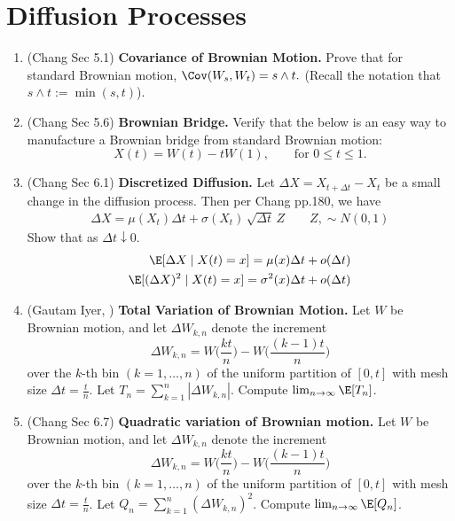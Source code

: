 \documentclass{article} %
\begin{document}
\section{Diffusion Processes}

\begin{enumerate}
	\item (Chang Sec 5.1) \textbf{Covariance of Brownian Motion.}  Prove that for standard Brownian motion, $\Cov(W_s, W_t) = s \wedge t.$ (Recall the notation that $s \wedge t := \min(s,t)$).
\item (Chang Sec 5.6) \textbf{Brownian Bridge.}  Verify that the below is an easy way to manufacture a Brownian bridge from standard Brownian motion:
	\[ X(t) = W(t)-t W(1), \qquad \text{for } 0 \leq t \leq 1.\]
\item (Chang Sec 6.1) \textbf{Discretized Diffusion.} Let $\Delta X = X_{t + \Delta t} - X_t$ be a small change in the diffusion process. Then per Chang pp.180, we have
	\begin{align*}
	 \Delta X = \mu(X_t) \Delta t + \sigma(X_t) \, \sqrt{\Delta t} \, Z  \qquad Z, \sim N(0,1)
	\end{align*}
	Show that as $\Delta t \downarrow 0$.
	\begin{align*}
	\E[\Delta X \mid X(t)=x] = \mu(x) \Delta t + o(\Delta t)\\	
	\E[(\Delta X)^2 \mid X(t)=x] = \sigma^2(x) \Delta t + o(\Delta t)
	\end{align*}
\item (Gautam Iyer, \textit{\href{https://www.math.cmu.edu/~gautam/sj/teaching/2021-22/944-scalc-finance1/pdfs/ch3-int.pdf}{\underline{}}}) \textbf{Total Variation of Brownian Motion.} Let $W$ be Brownian motion, and let $\Delta W_{k,n}$ denote the increment 
	\[ \Delta W_{k,n} = W \bigg( \frac{kt}{n} \bigg) -  W \bigg( \frac{(k-1)t}{n} \bigg)\] 
	over the $k$-th bin $(k=1, \hdots, n)$ of the uniform partition of $[0,t]$ with mesh size $\Delta t=\frac{t}{n}$.    Let $T_n = \sum_{k=1}^{n} |\Delta W_{k,n}|$.  Compute $\lim_{n \to \infty} \E[T_n]$.  
	\item (Chang Sec 6.7) \textbf{Quadratic variation of Brownian motion.} Let $W$ be Brownian motion, and let $\Delta W_{k,n}$ denote the increment 
	\[ \Delta W_{k,n} = W \bigg( \frac{kt}{n} \bigg) -  W \bigg( \frac{(k-1)t}{n} \bigg)\] 
	over the $k$-th bin $(k=1, \hdots, n)$ of the uniform partition of $[0,t]$ with mesh size $\Delta t=\frac{t}{n}$.  Let $Q_n = \sum_{k=1}^{n} (\Delta W_{k,n})^2$.  Compute $\lim_{n \to \infty} \E[Q_n]$.

\end{enumerate}
\end{document}
